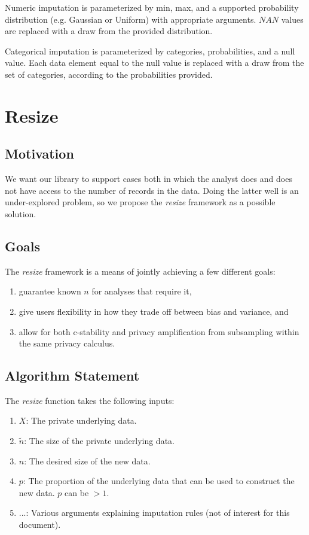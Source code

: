 \documentclass[11pt]{scrartcl} %
\begin{document}
Numeric imputation is parameterized by min, max, and a supported probability distribution (e.g. Gaussian or Uniform)
with appropriate arguments. $NAN$ values are replaced with a draw from the provided distribution. \newline

Categorical imputation is parameterized by categories, probabilities, and a null value.
Each data element equal to the null value is replaced with a draw from the set of categories,
according to the probabilities provided. \newline


\section{Resize}
\label{sec:resize}

\subsection{Motivation}
We want our library to support cases both in which the analyst does and does not have access to
the number of records in the data. Doing the latter well is an under-explored problem, so we 
propose the \emph{resize} framework as a possible solution.

\subsection{Goals}
The \emph{resize} framework is a means of jointly achieving a few different goals:
\begin{enumerate}
    \item guarantee known $n$ for analyses that require it,
    \item give users flexibility in how they trade off between bias and variance, and
    \item allow for both c-stability and privacy amplification from subsampling within the same privacy calculus.
\end{enumerate}

\subsection{Algorithm Statement}
\label{subsec:algorithm_statement}
The \emph{resize} function takes the following inputs:
\begin{enumerate}
    \item $X$: The private underlying data.
    \item $\tilde{n}$: The size of the private underlying data.
    \item $n$: The desired size of the new data.
    \item $p$: The proportion of the underlying data that can be used to construct the new data. $p$ can be $> 1$.
    \item $...$: Various arguments explaining imputation rules (not of interest for this document).
\end{enumerate}
\end{document}

